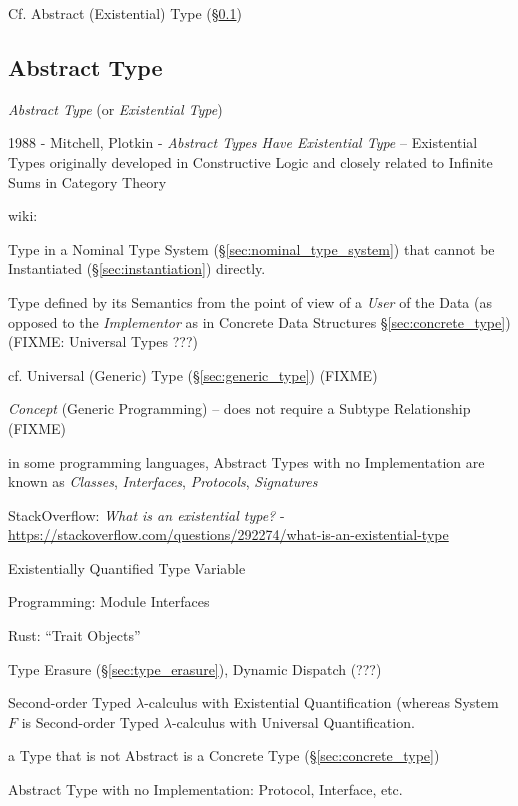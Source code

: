 \fist Cf. Abstract (Existential) Type (\S\ref{sec:abstract_type})



\subsection{Abstract Type}\label{sec:abstract_type}

\emph{Abstract Type} (or \emph{Existential Type})

1988 - Mitchell, Plotkin - \emph{Abstract Types Have Existential Type} --
Existential Types originally developed in Constructive Logic and closely
related to Infinite Sums in Category Theory

wiki:

Type in a Nominal Type System (\S\ref{sec:nominal_type_system}) that
cannot be Instantiated (\S\ref{sec:instantiation}) directly.

Type defined by its Semantics from the point of view of a
\emph{User} of the Data (as opposed to the \emph{Implementor} as in
Concrete Data Structures \S\ref{sec:concrete_type}) (FIXME: Universal Types ???)

cf. Universal (Generic) Type (\S\ref{sec:generic_type}) (FIXME)

\emph{Concept} (Generic Programming) -- does not require a Subtype Relationship
(FIXME)

in some programming languages, Abstract Types with no Implementation are known
as \emph{Classes}, \emph{Interfaces}, \emph{Protocols}, \emph{Signatures}

StackOverflow: \emph{What is an existential type?} -
\url{https://stackoverflow.com/questions/292274/what-is-an-existential-type}

Existentially Quantified Type Variable

Programming: Module Interfaces

Rust: ``Trait Objects''

Type Erasure (\S\ref{sec:type_erasure}), Dynamic Dispatch (???)

Second-order Typed $\lambda$-calculus with Existential Quantification
(whereas System $F$ is Second-order Typed $\lambda$-calculus with
Universal Quantification.

a Type that is not Abstract is a Concrete Type
(\S\ref{sec:concrete_type})

Abstract Type with no Implementation: Protocol, Interface, etc.

